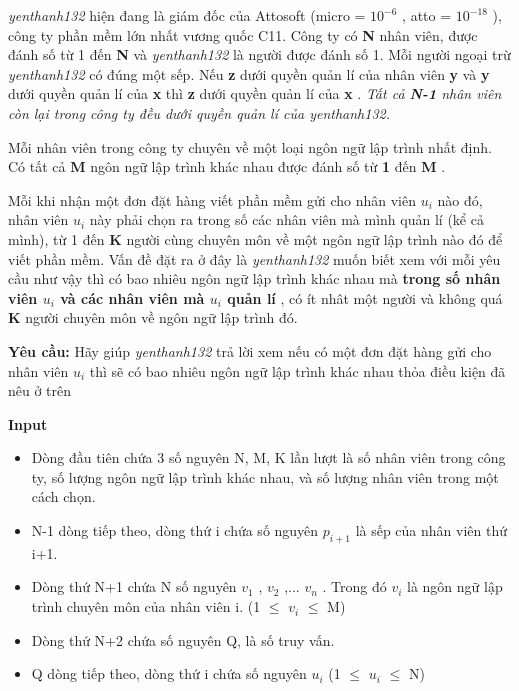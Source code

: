 



\emph{    yenthanh132   }   hiện đang là giám đốc của Attosoft (micro = $10^{-6}$   , atto = $10^{-18}$   ), công ty phần mềm lớn nhất vương quốc C11. Công ty có   \textbf{    N   }   nhân viên, được đánh số từ 1 đến   \textbf{    N   }   và   \emph{    yenthanh132   }   là người được đánh số 1. Mỗi người ngoại trừ   \emph{    yenthanh132   }   có đúng một sếp. Nếu   \textbf{    z   }   dưới quyền quản lí của nhân viên   \textbf{    y   }   và   \textbf{    y   }   dưới quyền quản lí của   \textbf{    x   }   thì   \textbf{    z   }   dưới quyền quản lí của   \textbf{    x   }   .   \emph{    Tất cả    \textbf{     N-1    }    nhân viên còn lại trong công ty đều dưới quyền quản lí của yenthanh132.   }

   Mỗi nhân viên trong công ty chuyên về một loại ngôn ngữ lập trình nhất định. Có tất cả   \textbf{    M   }   ngôn ngữ lập trình khác nhau được đánh số từ   \textbf{    1   }   đến   \textbf{    M   }   .  

   Mỗi khi nhận một đơn đặt hàng viết phần mềm gửi cho nhân viên $u_{i}$   nào đó, nhân viên $u_{i}$   này phải chọn ra trong số các nhân viên mà mình quản lí (kể cả mình), từ 1 đến   \textbf{    K   }   người cùng chuyên môn về một ngôn ngữ lập trình nào đó để viết phần mềm. Vấn đề đặt ra ở đây là   \emph{    yenthanh132   }   muốn biết xem với mỗi yêu cầu như vậy thì có bao nhiêu ngôn ngữ lập trình khác nhau mà   \textbf{    trong số nhân viên $u_{i}$    và các nhân viên mà $u_{i}$    quản lí   }   , có ít nhât một người và không quá   \textbf{    K   }   người chuyên môn về ngôn ngữ lập trình đó.  

\textbf{    Yêu cầu:   }   Hãy giúp   \emph{    yenthanh132   }   trả lời xem nếu có một đơn đặt hàng gửi cho nhân viên $u_{i}$   thì sẽ có bao nhiêu ngôn ngữ lập trình khác nhau thỏa điều kiện đã nêu ở trên  

\textbf{    Input   }
\begin{itemize}
	\item     Dòng đầu tiên chứa 3 số nguyên N,      M, K lần lượt là số nhân viên trong công ty, số lượng ngôn ngữ lập trình      khác nhau, và số lượng nhân viên trong một cách chọn.   
	\item     N-1 dòng tiếp theo, dòng thứ i chứa số nguyên      $p_{i+1}$    là sếp của nhân viên thứ i+1.   
	\item     Dòng thứ N+1 chứa N số nguyên $v_{1}$    ,      $v_{2}$    ,... $v_{n}$    . Trong đó $v_{i}$    là ngôn ngữ lập      trình chuyên môn của nhân viên i. (1  $\le$  $v_{i}$     $\le$  M)   
	\item     Dòng thứ N+2 chứa số nguyên Q, là      số truy vấn.   
	\item     Q dòng tiếp theo, dòng thứ i chứa      số nguyên $u_{i}$    (1  $\le$  $u_{i}$     $\le$  N)   
\end{itemize}

